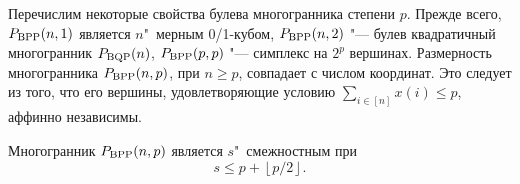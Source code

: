 Перечислим некоторые свойства булева многогранника степени $p$.
Прежде всего, $P_{\textup{BPP}}(n,1)$ является $n$"~мерным 0/1-кубом, $P_{\textup{BPP}}(n,2)$ "--- булев квадратичный многогранник $P_{\textup{BQP}}(n)$,
$P_{\textup{BPP}}(p,p)$ "--- симплекс на $2^p$ вершинах.
Размерность многогранника $P_{\textup{BPP}}(n,p)$, при $n \ge p$, совпадает с числом координат.
Это следует из того, что его вершины, удовлетворяющие условию $\sum_{i\in[n]} x(i) \le p$, аффинно независимы.


\begin{lemma}
\label{MaksLemma1} 
Многогранник $P_{\textup{BPP}}(n,p)$ является $s$"~смежностным при
\begin{equation*}
s \le p + \left\lfloor p / 2 \right\rfloor.
\end{equation*}
\end{lemma}

